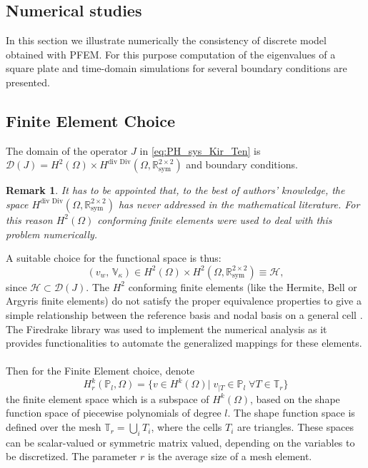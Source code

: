 \documentclass[preprint,12pt]{elsarticle}
\newtheorem{remark}{Remark}
\newcommand{\firstReviewer}[1]{\textcolor{red!80!black}{#1}}
\begin{document}
\firstReviewer{
\section{Numerical studies}
\label{sec:Num}
In this section we illustrate numerically the consistency of discrete model obtained with PFEM. For this purpose computation of the eigenvalues of a square plate and time-domain simulations for several boundary conditions are presented. 
\subsection{Finite Element Choice}
The domain of the operator $J$ in \eqref{eq:PH_sys_Kir_Ten} is $\mathcal{D}(J) = H^{2}(\Omega) \times  H^{\text{div Div}}(\Omega, \mathbb{R}^{2 \times 2}_{\text{sym}})$ and boundary conditions. 
\begin{remark}
	It has to be appointed that, to the best of authors' knowledge, the space $H^{\text{div Div}}(\Omega, \mathbb{R}^{2 \times 2}_{\text{sym}})$ has never addressed in the mathematical literature. For this reason $H^{2}(\Omega)$ conforming finite elements were used to deal with this problem numerically. 
\end{remark}
A suitable choice for the functional space is thus:
\begin{equation}
(v_w, \,\mathbb{V}_\kappa) \in H^{2}(\Omega) \times H^{2}(\Omega, \mathbb{R}^{2 \times 2}_{\text{sym}}) \equiv \mathscr{H},
\end{equation}
since $\mathscr{H} \subset \mathcal{D}(J)$. 
The $H^2$ conforming finite elements (like the Hermite, Bell or Argyris finite elements) do not satisfy the proper equivalence properties to give a simple relationship between the reference basis and nodal basis on a general cell \cite{KirbyFE}. The Firedrake library \cite{firedrake} was used to implement the numerical analysis as it provides functionalities to automate the generalized mappings for these elements. \\ \\
Then for the Finite Element choice, denote
\[ H_r^k(\mathbb{P}_l, \Omega) = \{ v \in H^k(\Omega)|\; v_{|T} \in \mathbb{P}_l \; \forall T \in \mathbb{T}_r \} 
\]
the finite element space which is a subspace of $H^k(\Omega)$, based on the shape function space of piecewise polynomials of degree $l$. The shape function space is defined over the mesh $\mathbb{T}_r = \bigcup_i T_i$, where the cells $T_i$ are triangles. These spaces can be scalar-valued or symmetric matrix valued, depending on the variables to be discretized. The parameter $r$ is the average size of a mesh element.
}
\end{document}
